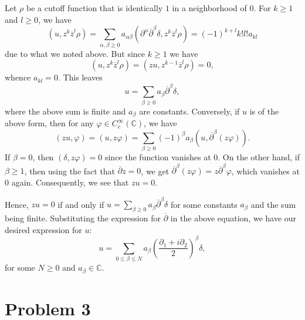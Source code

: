 \documentclass[10pt]{amsart}
\theoremstyle{thmstyle}
\theoremstyle{defstyle}
\newcommand{\bbC}{\mathbb{C}}
\renewcommand{\le}{\leqslant}
\renewcommand{\ge}{\geqslant}
\begin{document}
Let $\rho$ be a cutoff function that is identically $1$ in a neighborhood of $0$. For $k\ge 1$ and $l\ge 0$, we have 
\begin{equation*}
    (u, z^k\overline z^l\rho) = \sum_{\alpha,\beta\ge 0}a_{\alpha\beta}(\partial^\alpha\overline\partial^\beta\delta, z^k\overline z^l\rho) = (-1)^{k + l} k!l!a_{kl}
\end{equation*}
due to what we noted above. But since $k\ge 1$ we have 
\begin{equation*}
    (u, z^k\overline z^l\rho) = (zu, z^{k - 1}\overline z^l\rho) = 0,
\end{equation*}
whence $a_{kl} = 0$. This leaves 
\begin{equation*}
    u = \sum_{\beta\ge 0}a_\beta\overline\partial^\beta\delta,
\end{equation*}
where the above sum is finite and $a_\beta$ are constants. Conversely, if $u$ is of the above form, then for any $\varphi\in C_c^\infty(\bbC)$, we have 
\begin{equation*}
    (zu, \varphi) = (u, z\varphi) = \sum_{\beta\ge 0}(-1)^\beta a_\beta\left(u, \overline\partial^\beta(z\varphi)\right).
\end{equation*}
If $\beta = 0$, then $(\delta, z\varphi) = 0$ since the function vanishes at $0$. On the other hand, if $\beta\ge 1$, then using the fact that $\overline{\partial}z = 0$, we get $\overline\partial^\beta(z\varphi) = z\overline\partial^\beta\varphi$, which vanishes at $0$ again. Consequently, we see that $zu = 0$.

Hence, $zu = 0$ if and only if $u = \sum_{\beta\ge 0}a_\beta\overline\partial^\beta\delta$ for some constants $a_\beta$ and the sum being finite. Substituting the expression for $\overline\partial$ in the above equation, we have our desired expression for $u$: 
\begin{equation*}
    u = \sum_{0\le \beta\le N}a_\beta\left(\frac{\partial_1 + i\partial_2}{2}\right)^\beta\delta,
\end{equation*}
for some $N\ge 0$ and $a_\beta\in\bbC$.


\section{Problem 3}
\end{document}
